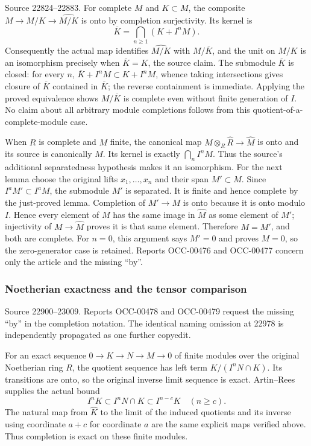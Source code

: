 Source 22824--22883. For complete \(M\) and \(K\subset M\), the composite \(M\to M/K\to\widehat{M/K}\) is onto by completion surjectivity. Its kernel is \[
\overline K=\bigcap_{n\geq1}(K+I^nM).
\] Consequently the actual map identifies \(\widehat{M/K}\) with \(M/\overline K\), and the unit on \(M/K\) is an isomorphism precisely when \(\overline K=K\), the source claim. The submodule \(\overline K\) is closed: for every \(n\), \(\overline K+I^nM\subset K+I^nM\), whence taking intersections gives closure of \(\overline K\) contained in \(\overline K\); the reverse containment is immediate. Applying the proved equivalence shows \(M/\overline K\) is complete even without finite generation of \(I\). No claim about all arbitrary module completions follows from this quotient-of-a-complete-module case.

When \(R\) is complete and \(M\) finite, the canonical map \(M\otimes_R\widehat R\to\widehat M\) is onto and its source is canonically \(M\). Its kernel is exactly \(\bigcap_n I^nM\). Thus the source's additional separatedness hypothesis makes it an isomorphism. For the next lemma choose the original lifts \(x_1,\ldots,x_n\) and their span \(M'\subset M\). Since \(I^aM'\subset I^aM\), the submodule \(M'\) is separated. It is finite and hence complete by the just-proved lemma. Completion of \(M'\to M\) is onto because it is onto modulo \(I\). Hence every element of \(M\) has the same image in \(\widehat M\) as some element of \(M'\); injectivity of \(M\to\widehat M\) proves it is that same element. Therefore \(M=M'\), and both are complete. For \(n=0\), this argument says \(M'=0\) and proves \(M=0\), so the zero-generator case is retained. Reports OCC-00476 and OCC-00477 concern only the article and the missing ``by''.

\subsubsection{Noetherian exactness and the tensor comparison}\label{noetherian-exactness-and-the-tensor-comparison}

Source 22900--23009. Reports OCC-00478 and OCC-00479 request the missing ``by'' in the completion notation. The identical naming omission at 22978 is independently propagated as one further copyedit.

For an exact sequence \(0\to K\to N\to M\to0\) of finite modules over the original Noetherian ring \(R\), the quotient sequence has left term \(K/(I^nN\cap K)\). Its transitions are onto, so the original inverse limit sequence is exact. Artin--Rees supplies the actual bound \[
I^nK\subset I^nN\cap K\subset I^{n-c}K\quad(n\geq c).
\] The natural map from \(\widehat K\) to the limit of the induced quotients and its inverse using coordinate \(a+c\) for coordinate \(a\) are the same explicit maps verified above. Thus completion is exact on these finite modules.

